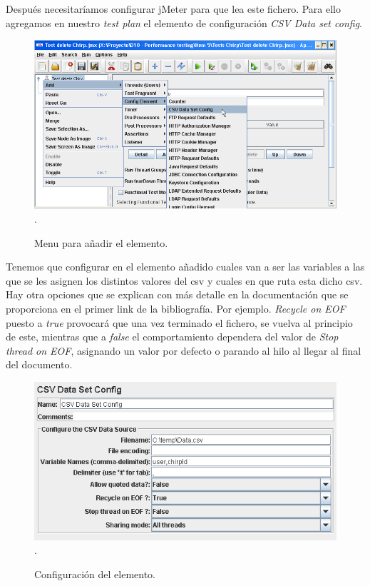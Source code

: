 \documentclass[a4paper]{article}
\begin{document}
Después necesitaríamos configurar jMeter para que lea este fichero. Para ello agregamos en nuestro \textit{test plan} el elemento de configuración \textit{CSV Data set config}.

\begin{figure}[h!]
\includegraphics[width=\linewidth]{menu_csv}.
  \caption{Menu para añadir el elemento.}
\end{figure}

Tenemos que configurar en el elemento añadido cuales van a ser las variables a las que se les asignen los distintos valores del csv y cuales en que ruta esta dicho csv. Hay otra opciones que se explican con más detalle en la documentación que se proporciona en el primer link de la bibliografía. Por ejemplo. \textit{Recycle on EOF} puesto a \textit{true} provocará que una vez terminado el fichero, se vuelva al principio de este, mientras que a \textit{false} el comportamiento dependera del valor de \textit{Stop thread on EOF}, asignando un valor por defecto o parando al hilo al llegar al final del documento.

\begin{figure}[h!]
\includegraphics[width=\linewidth]{Config1}.
  \caption{Configuración del elemento.}
\end{figure}
\end{document}
